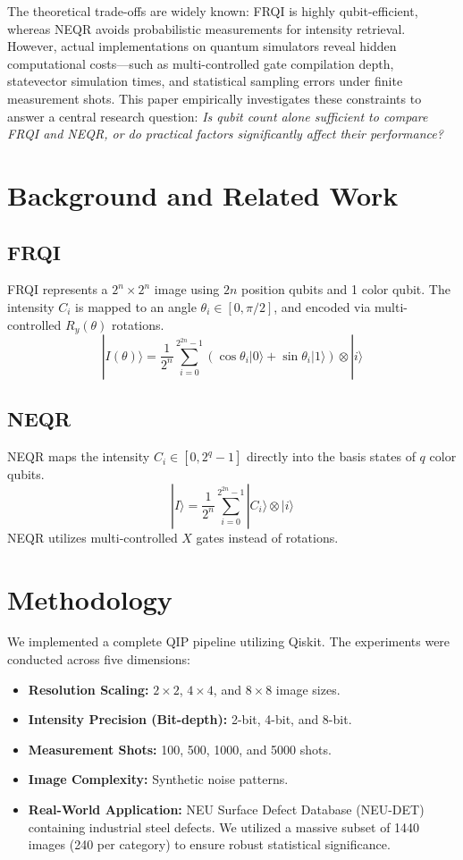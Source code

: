 \documentclass[conference]{IEEEtran}
\begin{document}
The theoretical trade-offs are widely known: FRQI is highly qubit-efficient, whereas NEQR avoids probabilistic measurements for intensity retrieval. However, actual implementations on quantum simulators reveal hidden computational costs---such as multi-controlled gate compilation depth, statevector simulation times, and statistical sampling errors under finite measurement shots. This paper empirically investigates these constraints to answer a central research question: \textit{Is qubit count alone sufficient to compare FRQI and NEQR, or do practical factors significantly affect their performance?}

\section{Background and Related Work}

\subsection{FRQI}
FRQI represents a $2^n \times 2^n$ image using $2n$ position qubits and 1 color qubit. The intensity $C_i$ is mapped to an angle $\theta_i \in [0, \pi/2]$, and encoded via multi-controlled $R_y(\theta)$ rotations.
\begin{equation}
|I(\theta)\rangle = \frac{1}{2^n} \sum_{i=0}^{2^{2n}-1} (\cos\theta_i |0\rangle + \sin\theta_i |1\rangle) \otimes |i\rangle
\end{equation}

\subsection{NEQR}
NEQR maps the intensity $C_i \in [0, 2^q - 1]$ directly into the basis states of $q$ color qubits.
\begin{equation}
|I\rangle = \frac{1}{2^n} \sum_{i=0}^{2^{2n}-1} |C_i\rangle \otimes |i\rangle
\end{equation}
NEQR utilizes multi-controlled $X$ gates instead of rotations.

\section{Methodology}
We implemented a complete QIP pipeline utilizing Qiskit. The experiments were conducted across five dimensions:
\begin{itemize}
\item \textbf{Resolution Scaling:} $2\times2$, $4\times4$, and $8\times8$ image sizes.
\item \textbf{Intensity Precision (Bit-depth):} 2-bit, 4-bit, and 8-bit.
\item \textbf{Measurement Shots:} 100, 500, 1000, and 5000 shots.
\item \textbf{Image Complexity:} Synthetic noise patterns.
\item \textbf{Real-World Application:} NEU Surface Defect Database (NEU-DET) containing industrial steel defects. We utilized a massive subset of 1440 images (240 per category) to ensure robust statistical significance.
\end{itemize}
\end{document}
